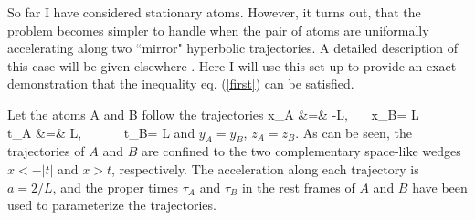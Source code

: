 So far I have considered stationary atoms.
However, it turns out,
that the problem becomes simpler
to handle when the pair of atoms are uniformally accelerating
along two ``mirror" hyperbolic trajectories.
A detailed description of this case will be given elsewhere \cite{reznik}.
Here I will use this set-up to provide an
exact demonstration that the inequality eq. (\ref{first})
can be satisfied.

Let the atoms A and B follow the trajectories
\beqa
x_A &=& -{L}, \  \ \
    x_B= {L}  \nonumber \\
t_A &=& {L\over2}, \ \ \ \ \ \
t_B= {L} 
\label{xt}
\eeqa
and $y_A=y_B$, $z_A=z_B$. As can be seen, the trajectories of
$A$ and $B$ are confined to the two complementary space-like wedges
$x< -|t|$ and $x>t$, respectively.
The acceleration along each trajectory is $a=2/L$, and
the proper times 
$\tau_A$ and $\tau_B$ in the rest frames of $A$ and $B$
have been used to parameterize
the trajectories.

